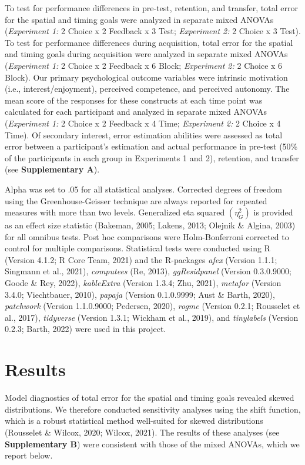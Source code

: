 \documentclass[
  man, donotrepeattitle,floatsintext]{apa7}
\begin{document}
To test for performance differences in pre-test, retention, and transfer, total error for the spatial and timing goals were analyzed in separate mixed ANOVAs (\emph{Experiment 1:} 2 Choice x 2 Feedback x 3 Test; \emph{Experiment 2:} 2 Choice x 3 Test). To test for performance differences during acquisition, total error for the spatial and timing goals during acquisition were analyzed in separate mixed ANOVAs (\emph{Experiment 1:} 2 Choice x 2 Feedback x 6 Block; \emph{Experiment 2:} 2 Choice x 6 Block). Our primary psychological outcome variables were intrinsic motivation (i.e., interest/enjoyment), perceived competence, and perceived autonomy. The mean score of the responses for these constructs at each time point was calculated for each participant and analyzed in separate mixed ANOVAs (\emph{Experiment 1:} 2 Choice x 2 Feedback x 4 Time; \emph{Experiment 2:} 2 Choice x 4 Time). Of secondary interest, error estimation abilities were assessed as total error between a participant's estimation and actual performance in pre-test (50\% of the participants in each group in Experiments 1 and 2), retention, and transfer (see \textbf{Supplementary A}).

Alpha was set to .05 for all statistical analyses. Corrected degrees of freedom using the Greenhouse-Geisser technique are always reported for repeated measures with more than two levels. Generalized eta squared \((\eta_{G}^2)\) is provided as an effect size statistic (Bakeman, 2005; Lakens, 2013; Olejnik \& Algina, 2003) for all omnibus tests. Post hoc comparisons were Holm-Bonferroni corrected to control for multiple comparisons. Statistical tests were conducted using R (Version 4.1.2; R Core Team, 2021) and the R-packages \emph{afex} (Version 1.1.1; Singmann et al., 2021), \emph{computees} (Re, 2013), \emph{ggResidpanel} (Version 0.3.0.9000; Goode \& Rey, 2022), \emph{kableExtra} (Version 1.3.4; Zhu, 2021), \emph{metafor} (Version 3.4.0; Viechtbauer, 2010), \emph{papaja} (Version 0.1.0.9999; Aust \& Barth, 2020), \emph{patchwork} (Version 1.1.0.9000; Pedersen, 2020), \emph{rogme} (Version 0.2.1; Rousselet et al., 2017), \emph{tidyverse} (Version 1.3.1; Wickham et al., 2019), and \emph{tinylabels} (Version 0.2.3; Barth, 2022) were used in this project.

\hypertarget{results}{%
\section{Results}\label{results}}

Model diagnostics of total error for the spatial and timing goals revealed skewed distributions. We therefore conducted sensitivity analyses using the shift function, which is a robust statistical method well-suited for skewed distributions (Rousselet \& Wilcox, 2020; Wilcox, 2021). The results of these analyses (see \textbf{Supplementary B}) were consistent with those of the mixed ANOVAs, which we report below.
\end{document}
